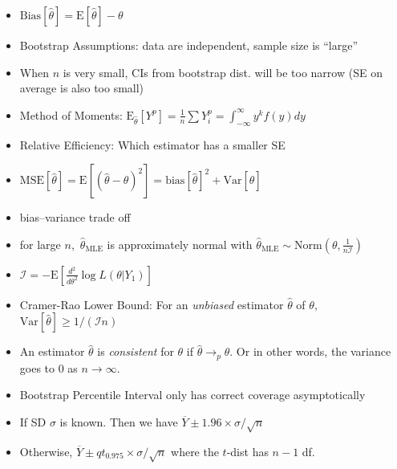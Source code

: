 \documentclass[10pt]{article}
\begin{document}
\begin{itemize}
    \item $\text{Bias}[\hat{\theta}] = \text{E}[\hat{\theta}]-\theta$
    \item Bootstrap Assumptions: data are independent, sample size is ``large''
    \item When $n$ is very small, CIs from bootstrap dist. will be too narrow (SE on average is also too small)
    \item Method of Moments: $\text{E}_{\hat{\theta}}[Y^p] = \frac{1}{n}\sum Y_i^p = \int_{-\infty}^{\infty}y^kf(y)dy$
    \item Relative Efficiency: Which estimator has a smaller SE
    \item $\text{MSE}[\hat{\theta}] = \text{E}[(\hat{\theta}-\theta)^2] = \text{bias}[\hat{\theta}]^2 + \text{Var}[\hat{\theta}]$
    \item bias--variance trade off
    \item for large $n,$ $\hat{\theta}_\text{MLE}$ is approximately normal with $\hat{\theta}_\text{MLE} \sim\text{Norm}(\theta, \frac{1}{n\mathcal{I}})$
    \item $\mathcal{I} = -\text{E}\left [ \frac{d^2}{d\theta^2}\log L(\theta | Y_1)\right]$
    \item Cramer-Rao Lower Bound: For an \emph{unbiased} estimator $\hat{\theta}$ of $\theta,$ $\text{Var}[\hat{\theta}]\ge 1/(\mathcal{I}n)$
    \item An estimator $\hat{\theta}$ is \emph{consistent} for $\theta$ if $\hat{\theta} \to_p \theta.$ Or in other words, the variance goes to $0$ as $n\to\infty.$
    \item Bootstrap Percentile Interval only has correct coverage asymptotically
    \item If SD $\sigma$ is known. Then we have $\overline{Y}\pm 1.96 \times \sigma/\sqrt{n}$
    \item Otherwise, $\overline{Y}\pm qt_{0.975} \times \sigma/\sqrt{n}$ where the $t$-dist has $n-1$ df.
\end{itemize}
\end{document}
